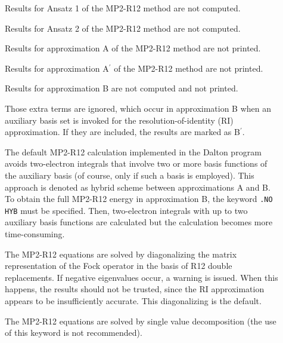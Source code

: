 \begin{description}

\item[]

Results for Ansatz 1 of the MP2-R12 method are not computed.

\item[]

Results for Ansatz 2 of the MP2-R12 method are not computed.

\item[]

Results for approximation A of the MP2-R12 method are not printed.

\item[]

Results for approximation A$^\prime$ of the MP2-R12 method are not printed.

\item[]

Results for approximation B are not computed and not printed.

\item[]

Those extra terms are ignored, which occur in approximation B when an auxiliary basis set
is invoked for the resolution-of-identity (RI) approximation. If they are included, 
the results are marked as B$^\prime$.

\item[]

The default MP2-R12 calculation implemented in the Dalton program
avoids two-electron integrals that involve
two or more basis functions of the auxiliary basis (of course, only
if such a basis is employed). This approach is denoted
as hybrid scheme between approximations A and B. To obtain the
full MP2-R12 energy in approximation B, the keyword \verb|.NO HYB| must
be specified. Then, two-electron integrals with up to two
auxiliary basis functions are calculated but the calculation becomes 
more time-consuming.

\item[]
The MP2-R12 equations are solved by diagonalizing the matrix representation 
of the Fock operator in the basis of R12 double replacements. If 
negative eigenvalues occur,
a warning is issued. When this happens, the results should not be trusted,
since the RI approximation appears to be insufficiently accurate.
This diagonalizing is the default.

\item[]
The MP2-R12 equations are solved by single value decomposition
(the use of this keyword is not recommended).


\end{description}
